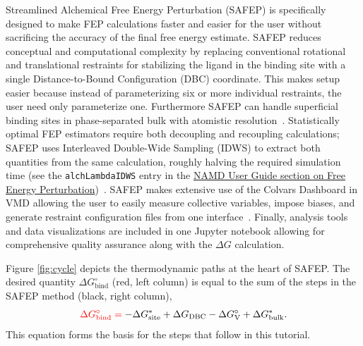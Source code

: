 \documentclass[9pt,tutorial]{Styling/livecoms}
\newcommand{\textInput}[1]{\texttt{#1}}
\begin{document}
Streamlined Alchemical Free Energy Perturbation (SAFEP) is specifically designed to make FEP calculations faster and easier for the user without sacrificing the accuracy of the final free energy estimate.
SAFEP reduces conceptual and computational complexity by replacing conventional rotational and translational restraints for stabilizing the ligand in the binding site with a single Distance-to-Bound Configuration (DBC) coordinate.
This makes setup easier because instead of parameterizing six or more individual restraints, the user need only parameterize one.
Furthermore SAFEP can handle superficial binding sites in phase-separated bulk with atomistic resolution~\cite{Salari2018}.
Statistically optimal FEP estimators require both decoupling and recoupling calculations; SAFEP uses Interleaved Double-Wide Sampling (IDWS) to extract both quantities from the same calculation, roughly halving the required simulation time (see the \textInput{alchLambdaIDWS} entry in the \href{https://www.ks.uiuc.edu/Research/namd/2.14/ug/node64.html}{NAMD User Guide section on Free Energy Perturbation})~\cite{Bernardi2020}.
SAFEP makes extensive use of the Colvars Dashboard in VMD allowing the user to easily measure collective variables, impose biases, and generate restraint configuration files from one interface~\cite{Henin2022}. 
Finally, analysis tools and data visualizations are included in one Jupyter notebook allowing for comprehensive quality assurance along with the $\Delta G$ calculation.

Figure \ref{fig:cycle} depicts the thermodynamic paths at the heart of SAFEP. 
The desired quantity $\Delta G^\circ_\mathrm{bind}$ (red, left column) is equal to the sum of the steps in the SAFEP method (black, right column), 
\begin{equation}\label{eq:overalldG}
    \color{red} \Delta G^\circ_\mathrm{bind} = \color{black} - \Delta G_\mathrm{site}^* + \Delta G_\mathrm{DBC} - \Delta G^\circ_\mathrm{V} + \Delta G^*_\mathrm{bulk} . 
\end{equation}
\noindent This equation forms the basis for the steps that follow in this tutorial. 
\end{document}
